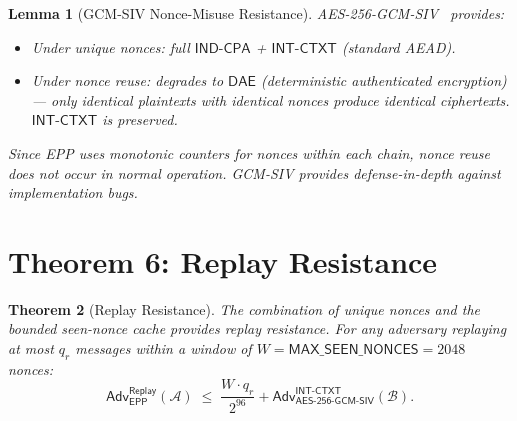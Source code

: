 \documentclass[11pt,a4paper]{article}
\newtheorem{theorem}{Theorem}[section]
\newtheorem{lemma}[theorem]{Lemma}
\theoremstyle{definition}
\theoremstyle{remark}
\newcommand{\adv}{\mathsf{Adv}}
\newcommand{\advA}{\mathcal{A}}
\newcommand{\advB}{\mathcal{B}}
\newcommand{\AEAD}{\mathsf{AES\text{-}256\text{-}GCM\text{-}SIV}}
\newcommand{\INDCPA}{\mathsf{IND\text{-}CPA}}
\newcommand{\INTCTXT}{\mathsf{INT\text{-}CTXT}}
\begin{document}
\begin{lemma}[GCM-SIV Nonce-Misuse Resistance]
\label{lem:gcm-siv}
AES-256-GCM-SIV~\cite{rfc8452} provides:
\begin{itemize}[nosep]
  \item Under unique nonces: full $\INDCPA$ + $\INTCTXT$ (standard AEAD).
  \item Under nonce reuse: degrades to $\mathsf{DAE}$ (deterministic
        authenticated encryption) --- only identical plaintexts with
        identical nonces produce identical ciphertexts.  $\INTCTXT$ is
        preserved.
\end{itemize}
Since EPP uses monotonic counters for nonces within each chain, nonce reuse
does not occur in normal operation.  GCM-SIV provides defense-in-depth
against implementation bugs.
\end{lemma}


\section{Theorem 6: Replay Resistance}
\label{sec:thm6}

\begin{theorem}[Replay Resistance]
\label{thm:replay}
The combination of unique nonces and the bounded seen-nonce cache provides
replay resistance.  For any adversary replaying at most $q_r$ messages
within a window of $W = \mathsf{MAX\_SEEN\_NONCES} = 2048$ nonces:
\[
  \adv^{\mathsf{Replay}}_{\mathsf{EPP}}(\advA) \;\leq\;
  \frac{W \cdot q_r}{2^{96}} + \adv^{\INTCTXT}_{\AEAD}(\advB).
\]
\end{theorem}
\end{document}
